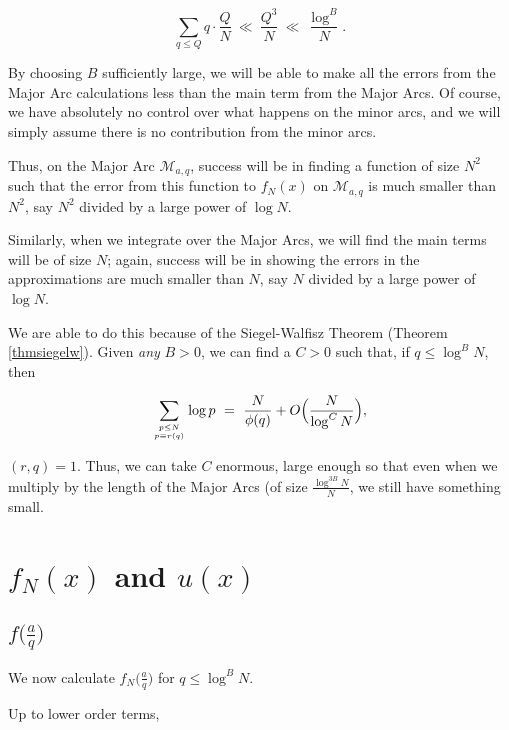 \documentclass[12pt,letterpaper]{report}
\newcommand\be{\begin{equation}}
\newcommand\ee{\end{equation}}
\begin{document}
\be \sum_{q\le Q} q \cdot \frac{Q}{N} \ \ll \ \frac{Q^3}{N} \ \ll
\ \frac{\log^B}{N}. \ee

By choosing $B$ sufficiently large, we will be able to make all
the errors from the Major Arc calculations less than the main term
from the Major Arcs. Of course, we have absolutely no control over
what happens on the minor arcs, and we will simply assume there is
no contribution from the minor arcs.

Thus, on the Major Arc $\mathcal{M}_{a,q}$, success will be in
finding a function of size $N^2$ such that the error from this
function to $f_N(x)$ on $\mathcal{M}_{a,q}$ is much smaller than
$N^2$, say $N^2$ divided by a large power of $\log N$.

Similarly, when we integrate over the Major Arcs, we will find the
main terms will be of size $N$; again, success will be in showing
the errors in the approximations are much smaller than $N$, say
$N$ divided by a large power of $\log N$.

We are able to do this because of the Siegel-Walfisz Theorem
(Theorem \ref{thmsiegelw}). Given \emph{any} $B > 0$, we can find
a $C > 0$ such that, if $q \le \log^B N$, then

\be \sum_{p \le N \atop p \equiv r (q) } \log p \ = \
\frac{N}{\phi(q)} + O\Big( \frac{N}{\log^C N} \Big), \ee

$(r,q) = 1$. Thus, we can take $C$ enormous, large enough so that
even when we multiply by the length of the Major Arcs (of size
$\frac{\log^{3B} N}{N}$, we still have something small.


\section{$f_N(x)$ and $u(x)$}

\subsection{$f\Big( \frac{a}{q} \Big)$}

We now calculate $f_N\Big( \frac{a}{q} \Big)$ for $q \le \log^B
N$.

Up to lower order terms,
\end{document}
